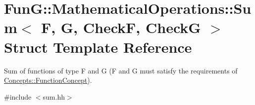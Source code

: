 \hypertarget{structFunG_1_1MathematicalOperations_1_1Sum}{\section{\-Fun\-G\-:\-:\-Mathematical\-Operations\-:\-:\-Sum$<$ \-F, \-G, \-Check\-F, \-Check\-G $>$ \-Struct \-Template \-Reference}
\label{structFunG_1_1MathematicalOperations_1_1Sum}
}


\-Sum of functions of type \-F and \-G (\-F and \-G must satisfy the requirements of \hyperlink{structFunG_1_1Concepts_1_1FunctionConcept}{\-Concepts\-::\-Function\-Concept}).  




{\ttfamily \#include $<$sum.\-hh$>$}

